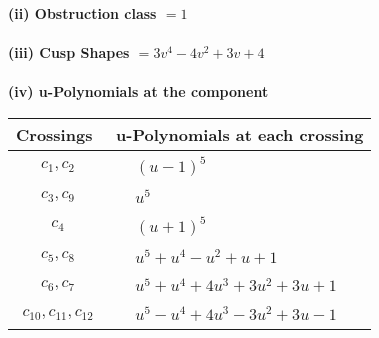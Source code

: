\documentclass[1p]{elsarticle_modified}
\theoremstyle{definition}
\begin{document}
\flushleft \textbf{(ii) Obstruction class $= 1$}\\~\\
\flushleft \textbf{(iii) Cusp Shapes $= 3 v^4-4 v^2+3 v+4$}\\~\\
\newpage\renewcommand{\arraystretch}{1}
\flushleft \textbf{(iv) u-Polynomials at the component}\newline \\
\begin{tabular}{m{50pt}|m{274pt}}
Crossings & \hspace{64pt}u-Polynomials at each crossing \\
\hline $$\begin{aligned}c_{1},c_{2}\end{aligned}$$&$\begin{aligned}
&(u-1)^5
\end{aligned}$\\
\hline $$\begin{aligned}c_{3},c_{9}\end{aligned}$$&$\begin{aligned}
&u^5
\end{aligned}$\\
\hline $$\begin{aligned}c_{4}\end{aligned}$$&$\begin{aligned}
&(u+1)^5
\end{aligned}$\\
\hline $$\begin{aligned}c_{5},c_{8}\end{aligned}$$&$\begin{aligned}
&u^5+u^4- u^2+u+1
\end{aligned}$\\
\hline $$\begin{aligned}c_{6},c_{7}\end{aligned}$$&$\begin{aligned}
&u^5+u^4+4 u^3+3 u^2+3 u+1
\end{aligned}$\\
\hline $$\begin{aligned}c_{10},c_{11},c_{12}\end{aligned}$$&$\begin{aligned}
&u^5- u^4+4 u^3-3 u^2+3 u-1
\end{aligned}$\\
\hline
\end{tabular}\\~\\
\end{document}
